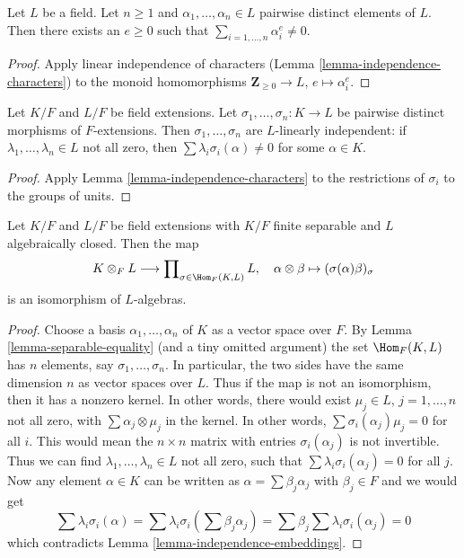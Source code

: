 \begin{lemma}
\label{lemma-sums-of-powers}
Let $L$ be a field. Let $n \geq 1$ and $\alpha_1, \ldots, \alpha_n \in L$
pairwise distinct elements of $L$. Then there exists an
$e \geq 0$ such that $\sum_{i = 1, \ldots, n} \alpha_i^e \not = 0$.
\end{lemma}

\begin{proof}
Apply linear independence of characters
(Lemma \ref{lemma-independence-characters})
to the monoid homomorphisms $\mathbf{Z}_{\geq 0} \to L$,
$e \mapsto \alpha_i^e$.
\end{proof}

\begin{lemma}
\label{lemma-independence-embeddings}
Let $K/F$ and $L/F$ be field extensions. Let
$\sigma_1, \ldots, \sigma_n : K \to L$ be pairwise distinct
morphisms of $F$-extensions. Then $\sigma_1, \ldots, \sigma_n$
are $L$-linearly independent: if $\lambda_1, \ldots, \lambda_n \in L$
not all zero, then $\sum \lambda_i\sigma_i(\alpha) \not = 0$
for some $\alpha \in K$.
\end{lemma}

\begin{proof}
Apply Lemma \ref{lemma-independence-characters} to
the restrictions of $\sigma_i$ to the groups of units.
\end{proof}

\begin{lemma}
\label{lemma-finite-separable-tensor-alg-closed}
Let $K/F$ and $L/F$ be field extensions with
$K/F$ finite separable and $L$ algebraically closed.
Then the map
$$
K \otimes_F L
\longrightarrow
\prod\nolimits_{\sigma \in \Hom_F(K, L)} L,\quad
\alpha \otimes \beta \mapsto (\sigma(\alpha)\beta)_\sigma
$$
is an isomorphism of $L$-algebras.
\end{lemma}

\begin{proof}
Choose a basis $\alpha_1, \ldots, \alpha_n$ of $K$ as a vector space over $F$.
By Lemma \ref{lemma-separable-equality} (and a tiny omitted argument) the set
$\Hom_F(K, L)$ has $n$ elements, say $\sigma_1, \ldots, \sigma_n$.
In particular, the two sides have the same dimension $n$ as vector
spaces over $L$. Thus if the map is not an isomorphism, then it
has a nonzero kernel. In other words, there would exist
$\mu_j \in L$, $j = 1, \ldots, n$ not all zero,
with $\sum \alpha_j \otimes \mu_j$ in the kernel.
In other words, $\sum \sigma_i(\alpha_j)\mu_j = 0$ for all $i$.
This would mean the $n \times n$ matrix with entries
$\sigma_i(\alpha_j)$ is not invertible. Thus we can find
$\lambda_1, \ldots, \lambda_n \in L$ not all zero,
such that $\sum \lambda_i\sigma_i(\alpha_j) = 0$ for all $j$.
Now any element $\alpha \in K$ can be written as
$\alpha = \sum \beta_j \alpha_j$ with $\beta_j \in F$ and we would get
$$
\sum \lambda_i\sigma_i(\alpha) =
\sum \lambda_i\sigma_i(\sum \beta_j \alpha_j) =
\sum \beta_j \sum \lambda_i\sigma_i(\alpha_j) = 0
$$
which contradicts Lemma \ref{lemma-independence-embeddings}.
\end{proof}







